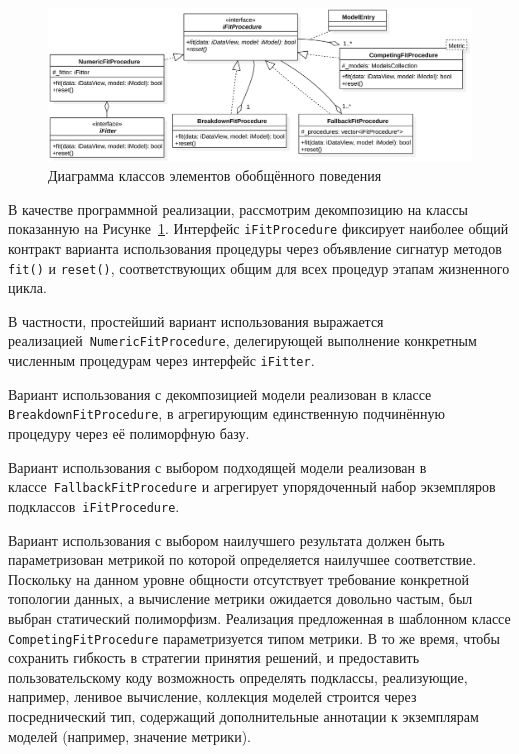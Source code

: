 \begin{figure}
    \centering
    \includegraphics[width=1\linewidth]{images/BasicFitProcedcureDiagram-01.eps}
    \caption{Диаграмма классов элементов обобщённого поведения}
    \label{fig:umff-basic-fitting-procedures}
\end{figure}

В качестве программной реализации, рассмотрим декомпозицию на классы показанную
на Рисунке~\ref{fig:umff-basic-fitting-procedures}. Интерфейс \texttt{iFitProcedure}
фиксирует наиболее общий контракт варианта использования процедуры через
объявление сигнатур методов \texttt{fit()} и \texttt{reset()}, соответствующих
общим для всех процедур этапам жизненного цикла.

В частности, простейший вариант использования выражается
реализацией~\texttt{NumericFitProcedure}, делегирующей выполнение конкретным
численным процедурам через интерфейс \texttt{iFitter}.

Вариант использования с декомпозицией модели реализован в классе
\texttt{BreakdownFitProcedure}, в агрегирующим единственную подчинённую
процедуру через её полиморфную базу.

Вариант использования с выбором подходящей модели реализован в
классе~\texttt{FallbackFitProcedure} и агрегирует упорядоченный набор
экземпляров подклассов~\texttt{iFitProcedure}.

Вариант использования с выбором наилучшего результата должен быть
параметризован метрикой по которой определяется наилучшее соответствие.
Поскольку на данном уровне общности отсутствует требование конкретной
топологии данных, а вычисление метрики ожидается довольно частым,
был выбран статический полиморфизм. Реализация предложенная в шаблонном
классе \texttt{CompetingFitProcedure} параметризуется типом метрики.
В то же время, чтобы сохранить гибкость в стратегии
принятия решений, и предоставить пользовательскому коду возможность
определять подклассы, реализующие, например, ленивое вычисление,
коллекция моделей строится через посреднический тип, содержащий
дополнительные аннотации к экземплярам моделей (например, значение
метрики).

